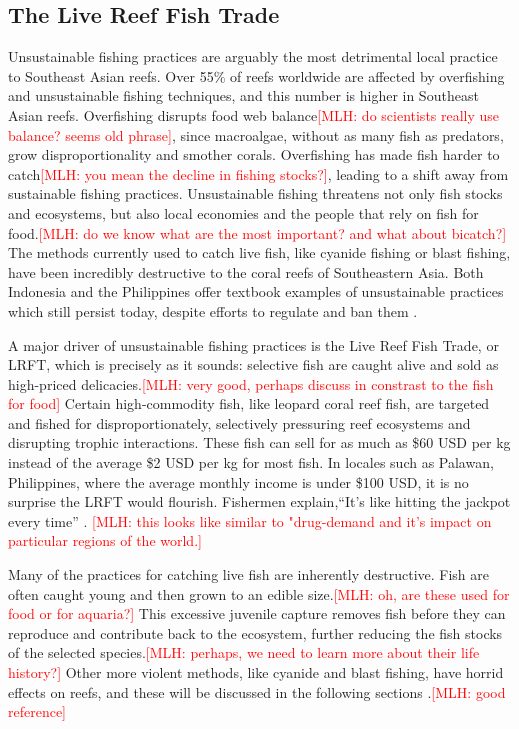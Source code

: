 \documentclass{book}\usepackage{knitr}
\newcommand{\red}[1]{\textcolor{red}{[MLH: #1]}}
\begin{document}
\begin{knitrout}
\begin{kframe}
{\subsection{The Live Reef Fish Trade}

Unsustainable fishing practices are arguably the most detrimental local practice to Southeast Asian reefs. Over 55\% of reefs worldwide are affected by overfishing and unsustainable fishing techniques, and this number is higher in Southeast Asian reefs. Overfishing disrupts food web balance\red{do scientists really use balance? seems old phrase}, since macroalgae, without as many fish as predators, grow disproportionality and smother corals. Overfishing has made fish harder to catch\red{you mean the decline in fishing stocks?}, leading to a shift away from sustainable fishing practices. Unsustainable fishing threatens not only fish stocks and ecosystems, but also local economies and the people that rely on fish for food.\red{do we know what are the most important?  and what about bicatch?} The methods currently used to catch live fish, like cyanide fishing or blast fishing, have been incredibly destructive to the coral reefs of Southeastern Asia. Both Indonesia and the Philippines offer textbook examples of unsustainable practices which still persist today, despite efforts to regulate and ban them \citep{coralreefalliance_2021}.

A major driver of unsustainable fishing practices is the Live Reef Fish Trade, or LRFT, which is precisely as it sounds: selective fish are caught alive and sold as high-priced delicacies.\red{very good, perhaps discuss in constrast to the fish for food} Certain high-commodity fish, like leopard coral reef fish, are targeted and fished for disproportionately, selectively pressuring reef ecosystems and disrupting trophic interactions. These fish can sell for as much as \$60 USD per kg instead of the average \$2 USD per kg for most fish. In locales such as Palawan, Philippines, where the average monthly income is under \$100 USD, it is no surprise the LRFT would flourish. Fishermen explain,``It's like hitting the jackpot every time'' \citep{10.2307/40603032}. \red{this looks like similar to "drug-demand and it's impact on particular regions of the world.}

Many of the practices for catching live fish are inherently destructive. Fish are often caught young and then grown to an edible size.\red{oh, are these used for food or for aquaria?} This excessive juvenile capture removes fish before they can reproduce and contribute back to the ecosystem, further reducing the fish stocks of the selected species.\red{perhaps, we need to learn more about their life history?} Other more violent methods, like cyanide and blast fishing, have horrid effects on reefs, and these will be discussed in the following sections \citep{10.2307/40603032}.\red{good reference}  

}
\end{kframe}
\end{knitrout}
\end{document}
